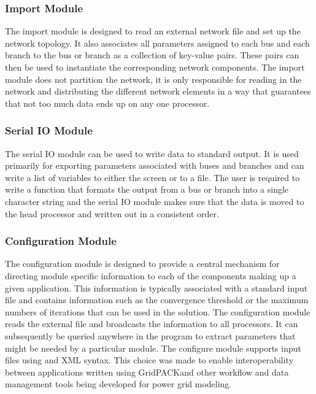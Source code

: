 \documentclass{acm_proc_article-sp}
\begin{document}
\subsubsection{Import Module}
The import module is designed to read an external network file and set up the
network topology. It also associates all parameters assigned to each bus and
each branch to the bus or branch as a collection of key-value pairs. These pairs
can then be used to instantiate the corresponding network components.
The import module does not partition the network, it is only responsible for reading
in the network and distributing the different network elements in a way that
guarantees that not too much data ends up on any one processor.

\subsubsection{Serial IO Module}
The serial IO module can be used to write data to standard output. It is used
primarily for exporting parameters associated with buses and branches and can
write a list of variables to either the screen or to a file. The user is
required to write a function that formats the output from a bus or branch into a
single character string and the serial IO module makes sure that the data is
moved to the head processor and written out in a consistent order.

\subsubsection{Configuration Module}
The configuration module is designed to provide a central mechanism for directing module
specific information to each of the components making up a given application.
This information is typically associated with a standard input file and contains
information such as the convergence threshold or the maximum numbers of
iterations that can be used in the solution. The configuration module reads the
external file and broadcasts the information to all processors. It can
subsequently be queried anywhere in the program to extract parameters that might
be needed by a particular module. The configure module supports input files
using and XML syntax. This choice was made to enable interoperability between
applications written using GridPACK\texttrademark and other workflow and data
management tools being developed for power grid modeling.
\end{document}
